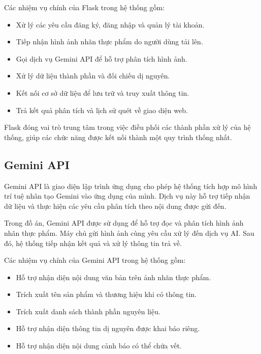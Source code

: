 	Các nhiệm vụ chính của Flask trong hệ thống gồm:
	
	\begin{itemize}
		\item Xử lý các yêu cầu đăng ký, đăng nhập và quản lý tài khoản.
		\item Tiếp nhận hình ảnh nhãn thực phẩm do người dùng tải lên.
		\item Gọi dịch vụ Gemini API để hỗ trợ phân tích hình ảnh.
		\item Xử lý dữ liệu thành phần và đối chiếu dị nguyên.
		\item Kết nối cơ sở dữ liệu để lưu trữ và truy xuất thông tin.
		\item Trả kết quả phân tích và lịch sử quét về giao diện web.
	\end{itemize}
	
	Flask đóng vai trò trung tâm trong việc điều phối các thành phần
	xử lý của hệ thống, giúp các chức năng được kết nối thành một
	quy trình thống nhất.
	
	\subsection{Gemini API}
	
	Gemini API là giao diện lập trình ứng dụng cho phép hệ thống
	tích hợp mô hình trí tuệ nhân tạo Gemini vào ứng dụng của mình.
	Dịch vụ này hỗ trợ tiếp nhận dữ liệu và thực hiện các yêu cầu
	phân tích theo nội dung được gửi đến.
	
	Trong đồ án, Gemini API được sử dụng để hỗ trợ đọc và phân tích
	hình ảnh nhãn thực phẩm. Máy chủ gửi hình ảnh cùng yêu cầu xử lý
	đến dịch vụ AI. Sau đó, hệ thống tiếp nhận kết quả và xử lý
	thông tin trả về.
	
	Các nhiệm vụ chính của Gemini API trong hệ thống gồm:
	
	\begin{itemize}
		\item Hỗ trợ nhận diện nội dung văn bản trên ảnh nhãn thực phẩm.
		\item Trích xuất tên sản phẩm và thương hiệu khi có thông tin.
		\item Trích xuất danh sách thành phần nguyên liệu.
		\item Hỗ trợ nhận diện thông tin dị nguyên được khai báo riêng.
		\item Hỗ trợ nhận diện nội dung cảnh báo có thể chứa vết.
	\end{itemize}
	
